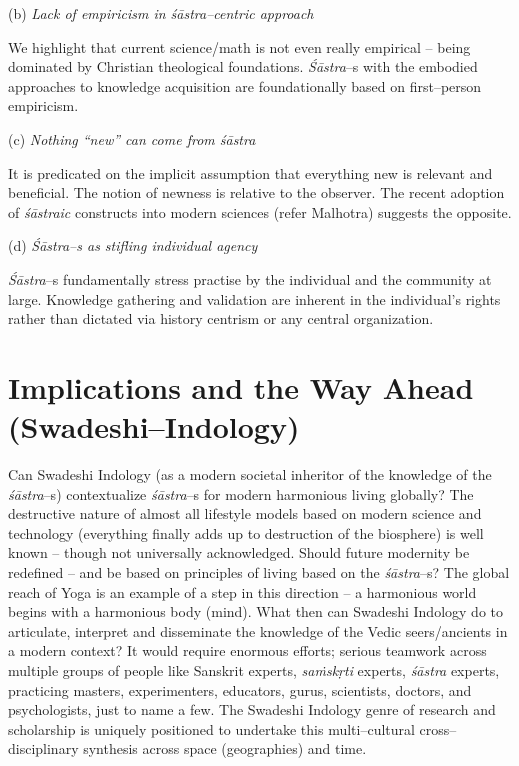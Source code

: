 (b) \textit{Lack of empiricism in śāstra–centric approach}

We highlight that current science/math is not even really empirical – being dominated by Christian theological foundations. \textit{Śāstra}–s with the embodied approaches to knowledge acquisition are foundationally based on first–person empiricism.

(c) \textit{Nothing “new” can come from śāstra}

It is predicated on the implicit assumption that everything new is relevant and beneficial. The notion of newness is relative to the observer. The recent adoption of \textit{śāstraic} constructs into modern sciences (refer Malhotra) suggests the opposite.

(d) \textit{Śāstra–s as stifling individual agency}

\textit{Śāstra}–s fundamentally stress practise by the individual and the community at large. Knowledge gathering and validation are inherent in the individual's rights rather than dictated via history centrism or any central organization.


\section*{Implications and the Way Ahead (Swadeshi–Indology)}

Can Swadeshi Indology (as a modern societal inheritor of the knowledge of the \textit{śāstra}–s) contextualize \textit{śāstra}–s for modern harmonious living globally? The destructive nature of almost all lifestyle models based on modern science and technology (everything finally adds up to destruction of the biosphere) is well known – though not universally acknowledged. Should future modernity be redefined – and be based on principles of living based on the \textit{śāstra}–s? The global reach of Yoga is an example of a step in this direction – a harmonious world begins with a harmonious body (mind). What then can Swadeshi Indology do to articulate, interpret and disseminate the knowledge of the Vedic seers/ancients in a modern context? It would require enormous efforts; serious teamwork across multiple groups of people like Sanskrit experts, \textit{saṁskṛti} experts, \textit{śāstra} experts, practicing masters, experimenters, educators, gurus, scientists, doctors, and psychologists, just to name a few. The Swadeshi Indology genre of research and scholarship is uniquely positioned to undertake this multi–cultural cross–disciplinary synthesis across space (geographies) and time.


